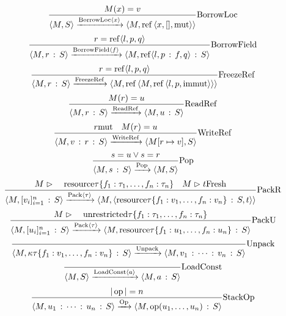 \documentclass{article}
\newcommand{\colons}{\,:\,}
\newcommand{\tmop}[1]{\ensuremath{\operatorname{#1}}}
\newcommand{\tmstrong}[1]{\textbf{#1}}
\newcommand{\tmxspace}{\hspace{1em}}
\begin{document}
\[ \frac{M (x) = v}{\langle M, S \rangle \xrightarrow{\tmop{BorrowLoc} \langle
   x \rangle} \left\langle M, \tmstrong{\tmop{ref}}  \left\langle x, [],
   \tmstrong{\tmop{mut}} \right\rangle \right\rangle} 
   \tmstrong{\tmop{BorrowLoc}} \]
\[ \frac{r = \tmstrong{\tmop{ref}} \langle l, p, q \rangle}{\langle M, r
   \colons S \rangle \xrightarrow{\tmop{BorrowField} \langle f \rangle}
   \left\langle M, \tmstrong{\tmop{ref}}  \langle l, p \colons f, q \rangle
   \colons S \right\rangle}  \tmstrong{\tmop{BorrowField}} \]
\[ \frac{r = \tmstrong{\tmop{ref}}  \langle l, p, q \rangle}{\langle M, r
   \colons S \rangle \xrightarrow{\tmop{FreezeRef}} \left\langle M,
   \tmstrong{\tmop{ref}}  \left\langle M, \tmstrong{\tmop{ref}}  \left\langle
   l, p, \tmstrong{\tmop{immut}} \right\rangle \right\rangle \right\rangle} 
   \tmstrong{\tmop{FreezeRef}} \]
\[ \frac{M (r) = u}{\langle M, r \colons S \rangle
   \xrightarrow{\tmop{ReadRef}} \langle M, u \colons S \rangle} 
   \tmstrong{\tmop{ReadRef}} \]
\[ \frac{r \tmstrong{\tmop{mut}} \quad M (r) = u}{\langle M, v \colons r
   \colons S \rangle \xrightarrow{\tmop{WriteRef}} \langle M [r \mapsto v], S
   \rangle}  \tmstrong{\tmop{WriteRef}} \]
\[ \frac{s = u \vee s = r}{\langle M, s \colons S \rangle
   \xrightarrow{\tmop{Pop}} \langle M, S \rangle}  \tmstrong{\tmop{Pop}} \]
\[ \frac{M \vartriangleright \tmxspace \tmstrong{\tmop{resource}} \tau \{ f_1
   : \tau_1, \ldots, f_n : \tau_n \} \quad M \vartriangleright t
   \tmstrong{\tmop{Fresh}}}{\langle M, [v_i]^n_{i = 1} \colons S \rangle
   \xrightarrow{\tmop{Pack} \langle \tau \rangle} \left\langle M, \left\langle
   \tmstrong{\tmop{resource}} \tau \{ f_1 : v_1, \ldots, f_n : v_n \} \colons
   S, t \right\rangle \right\rangle}  \tmstrong{\tmop{PackR}} \]
\[ \frac{M \vartriangleright \tmxspace \tmstrong{\tmop{unrestricted}} \tau \{
   f_1 : \tau_1, \ldots, f_n : \tau_n \}}{\langle M, [u_i]^n_{i = 1} \colons S
   \rangle \xrightarrow{\tmop{Pack} \langle \tau \rangle} \left\langle M,
   \tmstrong{\tmop{resource}} \tau \{ f_1 : u_1, \ldots, f_n : u_n \} \colons
   S \right\rangle}  \tmstrong{\tmop{PackU}} \]
\[ \frac{}{\langle M, \kappa \tau \{ f_1 : v_1, \ldots, f_n : v_n \} \colons S
   \rangle \xrightarrow{\tmop{Unpack}} \langle M, v_1 \colons \cdots \colons
   v_n \colons S \rangle}  \tmstrong{\tmop{Unpack}} \]
\[ \frac{}{\langle M, S \rangle \xrightarrow{\tmop{LoadConst} \langle a
   \rangle} \langle M, a \colons S \rangle}  \tmstrong{\tmop{LoadConst}} \]
\[ \frac{| \tmop{op} | = n}{\langle M, u_1 \colons \cdots \colons u_n \colons
   S \rangle \xrightarrow{\tmop{Op}} \langle M, \tmop{op} (u_1, \ldots, u_n)
   \colons S \rangle}  \tmstrong{\tmop{StackOp}} \]
\end{document}
